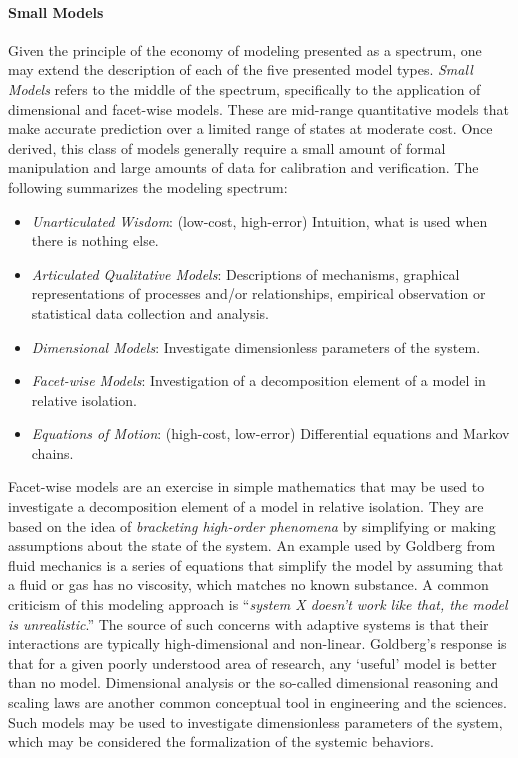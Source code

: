 \paragraph{Small Models} 
Given the principle of the economy of modeling presented as a spectrum, one may extend the description of each of the five presented model types. \emph{Small Models} refers to the middle of the spectrum, specifically to the application of dimensional and facet-wise models. These are mid-range quantitative models that make accurate prediction over a limited range of states at moderate cost. Once derived, this class of models generally require a small amount of formal manipulation and large amounts of data for calibration and verification. The following summarizes the modeling spectrum:

\begin{itemize}
	\item \emph{Unarticulated Wisdom}: (low-cost, high-error) Intuition, what is used when there is nothing else.
	\item \emph{Articulated Qualitative Models}: Descriptions of mechanisms, graphical representations of processes and/or relationships, empirical observation or statistical data collection and analysis.
	\item \emph{Dimensional Models}: Investigate dimensionless parameters of the system.
	\item \emph{Facet-wise Models}: Investigation of a decomposition element of a model in relative isolation.
	\item \emph{Equations of Motion}: (high-cost, low-error) Differential equations and Markov chains.
\end{itemize}

Facet-wise models are an exercise in simple mathematics that may be used to investigate a decomposition element of a model in relative isolation. They are based on the idea of \emph{bracketing high-order phenomena} by simplifying or making assumptions about the state of the system. An example used by Goldberg from fluid mechanics is a series of equations that simplify the model by assuming that a fluid or gas has no viscosity, which matches no known substance. A common criticism of this modeling approach is ``\emph{system X doesn't work like that, the model is unrealistic}.'' The source of such concerns with adaptive systems is that their interactions are typically high-dimensional and non-linear. Goldberg's response is that for a given poorly understood area of research, any `useful' model is better than no model. Dimensional analysis or the so-called dimensional reasoning and scaling laws are another common conceptual tool in engineering and the sciences. Such models may be used to investigate dimensionless parameters of the system, which may be considered the formalization of the systemic behaviors.


